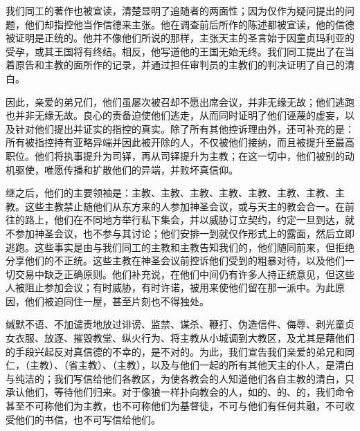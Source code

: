 我们同工的著作也被宣读，清楚显明了追随者的两面性；因为仅作为疑问提出的问题，他们却指控他当作信德来主张。他在调查前后所作的陈述都被宣读，他的信德被证明是正统的。他并不像他们所说的那样，主张天主的圣言始于因童贞玛利亚的受孕，或其王国将有终结。相反，他写道他的王国无始无终。我们同工提出了在当着原告和主教的面所作的记录，并通过担任审判员的主教们的判决证明了自己的清白。\par

因此，亲爱的弟兄们，他们虽屡次被召却不愿出席会议，并非无缘无故；他们逃跑也并非无缘无故。良心的责备迫使他们逃走，从而同时证明了他们诬蔑的虚妄，以及针对他们提出并证实的指控的真实。除了所有其他控诉理由外，还可补充的是：所有被指控持有亚略异端并因此被开除的人，不仅被他们接纳，而且被提升至最高职位。他们将执事提升为司铎，再从司铎提升为主教；在这一切中，他们被别的动机驱使，唯愿传播和扩散他们的异端，并败坏真信仰。\par

继之后，他们的主要领袖是：主教、主教、主教、主教、主教、主教、主教、主教。这些主教禁止随他们从东方来的人参加神圣会议，或与天主的教会合一。在前往的路上，他们在不同地方举行私下集会，并以威胁订立契约，约定一旦到达，就不参加神圣会议，也不参与其讨论；他们安排一到就仅作形式上的露面，然后立即逃跑。这些事实是由与我们同工的主教和主教告知我们的，他们随同前来，但拒绝分享他们的不正统。这些主教在神圣会议前控诉他们受到的粗暴对待，以及他们一切交易中缺乏正确原则。他们补充说，在他们中间仍有许多人持正统意见，但这些人被阻止参加会议；有时威胁，有时许诺，被用来使他们留在那一派中。为此原因，他们被迫同住一屋，甚至片刻也不得独处。\par

缄默不语、不加谴责地放过诽谤、监禁、谋杀、鞭打、伪造信件、侮辱、剥光童贞女衣服、放逐、摧毁教堂、纵火行为、将主教从小城调到大教区，及尤其是藉他们的手段兴起反对真信德的不幸的，是不对的。为此，我们宣告我们亲爱的弟兄和同仁，（主教）、（省主教）、（主教），以及与他们一起的所有其他天主的仆人，是清白与纯洁的；我们写信给他们各教区，为使各教会的人知道他们各自主教的清白，只承认他们，等待他们归来。对于像狼一样扑向教会的人，如的、的、的，我们命令甚至不可称他们为主教，也不可称他们为基督徒，不可与他们有任何共融，不可收受他们的书信，也不可写信给他们。\par

